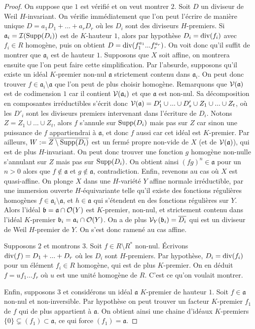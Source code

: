 \begin{proof}
On suppose que $1$ est vérifié et on veut montrer $2$. Soit $D$ un diviseur de Weil $H$-invariant. On vérifie immédiatement que l'on peut l'écrire de manière unique $D=a_1D_1+...+a_rD_r$ où les $D_i$ sont des diviseurs $H$-premiers. Si $\mathfrak{a}_i=\mathcal{I}(\operatorname{Supp}(D_i))$ est de $K$-hauteur $1$, alors par hypothèse $D_i=\operatorname{div}(f_i)$ avec $f_i\in R$ homogène, puis on obtient $D=\operatorname{div}(f_1^{a_1}...f_r^{a_r})$. On voit donc qu'il suffit de montrer que $\mathfrak{a}_i$ est de hauteur $1$. Supposons que $X$ soit affine, on montrera ensuite que l'on peut faire cette simplification. Par l'absurde, supposons qu'il existe un idéal $K$-premier non-nul $\mathfrak{a}$ strictement contenu dans $\mathfrak{a}_i$. On peut donc trouver $f\in \mathfrak{a}_i\setminus\mathfrak{a}$	 que l'on peut de plus choisir homogène. Remarquons que $\mathcal{V}(\mathfrak{a})$ est de codimension $1$ car il contient $\mathcal{V}(\mathfrak{a}_i)$ et que $\mathfrak{a}$ est non-nul. Sa décomposition en composantes irréductibles s'écrit donc $\mathcal{V}(\mathfrak{a})=D'_1\cup...\cup D'_s\cup Z_1\cup ...\cup Z_t$, où les $D'_i$ sont les diviseurs premiers intervenant dans l'écriture de $D_i$. Notons $Z=Z_1\cup ...\cup Z_t$, alors $f$ s'annule sur $\operatorname{Supp}(D_i)$ mais pas sur $Z$ car sinon une puissance de $f$ appartiendrai à $\mathfrak{a}$, et donc $f$ aussi car cet idéal est $K$-premier. Par ailleurs, $W:=\overline{Z\setminus \operatorname{Supp}(D_i)}$ est un fermé propre non-vide de $X$ (et de $\mathcal{V}(\mathfrak{a})$), qui est de plus $H$-invariant. On peut donc trouver une fonction $g$ homogène non-nulle s'annulant sur $Z$ mais pas sur $\operatorname{Supp}(D_i)$. On obtient ainsi $(fg)^n\in\mathfrak{a}$ pour un $n>0$ alors que $f\notin \mathfrak{a}$ et $g\notin\mathfrak{a}$, contradiction. Enfin, revenons au cas où $X$ est quasi-affine. On plonge $X$ dans une $H$-variété $Y$ affine normale irréductible, par une immersion ouverte $H$-équivariante telle qu'il existe des fonctions régulières homogènes $f\in\mathfrak{a}_i\setminus \mathfrak{a}$, et $h\in\mathfrak{a}$ qui s'étendent en des fonctions régulières sur $Y$. Alors l'idéal $\mathfrak{b}=\mathfrak{a}\cap \mathcal{O}(Y)$ est $K$-premier, non-nul, et strictement contenu dans l'idéal $K$-premier $\mathfrak{b}_i=\mathfrak{a}_i\cap \mathcal{O}(Y)$. On a de plus $\mathcal{V}_Y(\mathfrak{b}_i)=\overline{D_i}$ qui est un diviseur de Weil $H$-premier de $Y$. On s'est donc ramené au cas affine.

Supposons $2$ et montrons $3$. Soit $f\in R\setminus R^*$ non-nul. Écrivons $\operatorname{div}(f)=D_1+...+D_r$ où les $D_i$ sont $H$-premiers. Par hypothèse, $D_i=\operatorname{div}(f_i)$ pour un élément $f_i\in R$ homogène, qui est de plus $K$-premier. On en déduit $f=uf_1...f_r$ où $u$ est une unité homogène de $R$. C'est ce qu'on voulait montrer.

Enfin, supposons $3$ et considérons un idéal $\mathfrak{a}$ $K$-premier de hauteur $1$. Soit $f\in\mathfrak{a}$ non-nul et non-inversible. Par hypothèse on peut trouver un facteur $K$-premier $f_1$ de $f$ qui de plus appartient à $\mathfrak{a}$. On obtient ainsi une chaine d'idéaux $K$-premiers $\lbrace 0\rbrace\varsubsetneq (f_1)\subset \mathfrak{a}$, ce qui force $(f_1)=\mathfrak{a}$.
\end{proof}

